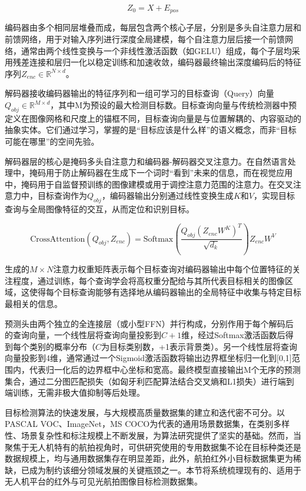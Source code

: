 \begin{equation}
    Z_0 = X + E_{pos}
\end{equation}

编码器由多个相同层堆叠而成，每层包含两个核心子层，分别是多头自注意力层和前馈网络，用于对输入序列进行深度全局建模，每个自注意力层后接一个前馈网络，通常由两个线性变换与一个非线性激活函数（如GELU）组成，每个子层均采用残差连接和层归一化以稳定训练和加速收敛，编码器最终输出深度编码后的特征序列$Z_{enc} \in \mathbb{R}^{N \times d}$。

解码器接收编码器输出的特征序列和一组可学习的目标查询（Query）向量$Q_{obj} \in \mathbb{R}^{M \times d}$，其中M为预设的最大检测目标数。目标查询向量与传统检测器中预定义在图像网格和尺度上的锚框不同，目标查询向量是与位置解耦的、内容驱动的抽象实体。它们通过学习，掌握的是“目标应该是什么样”的语义概念，而非“目标可能在哪里”的空间先验。

解码器层的核心是掩码多头自注意力和编码器-解码器交叉注意力。在自然语言处理中，掩码用于防止解码器在生成下一个词时“看到”未来的信息，而在视觉应用中，掩码用于自监督预训练的图像建模或用于调控注意力范围的注意力。在交叉注意力中，目标查询作为$Q_{obj}$，编码器输出分别通过线性变换生成$K$和$V$，实现目标查询与全局图像特征的交互，从而定位和识别目标。

\begin{equation}
    \text{CrossAttention}(Q_{obj}, Z_{enc}) = \text{Softmax}\left(\frac{Q_{obj} (Z_{enc} W^K)^T}{\sqrt{d_k}}\right) Z_{enc} W^V
\end{equation}

生成的$M \times N$注意力权重矩阵表示每个目标查询对编码器输出中每个位置特征的关注程度，通过训练，每个查询学会将高权重分配给与其所代表目标相关的图像区域，这使得每个目标查询能够有选择地从编码器输出的全局特征中收集与特定目标最相关的信息。

预测头由两个独立的全连接层（或小型FFN）并行构成，分别作用于每个解码后的查询向量，一个线性层将查询向量投影到$C+1$维，经过Softmax激活函数后得到每个类别的概率分布（$C$为目标类别数，+1表示背景类）。另一个线性层将查询向量投影到4维，通常通过一个Sigmoid激活函数将输出边界框坐标归一化到[0,1]范围内，代表归一化后的边界框中心坐标和宽高。最终模型直接输出M个无序的预测集合，通过二分图匹配损失（如匈牙利匹配算法结合交叉熵和L1损失）进行端到端训练，无需非极大值抑制等后处理。


目标检测算法的快速发展，与大规模高质量数据集的建立和迭代密不可分。以PASCAL VOC\cite{everingham2010pascal}、ImageNet\cite{Deng2009ImageNet}，MS COCO\cite{Lin2014COCO}为代表的通用场景数据集，在类别多样性、场景复杂性和标注规模上不断发展，为算法研究提供了坚实的基础。然而，当聚焦于无人机特有的航拍视角时，可供研究使用的专用数据集不论在目标种类还是数据规模上，均与通用数据集存在明显差距，此外，航拍红外小目标数据集更为稀缺，已成为制约该细分领域发展的关键瓶颈之一。本节将系统梳理现有的、适用于无人机平台的红外与可见光航拍图像目标检测数据集。

